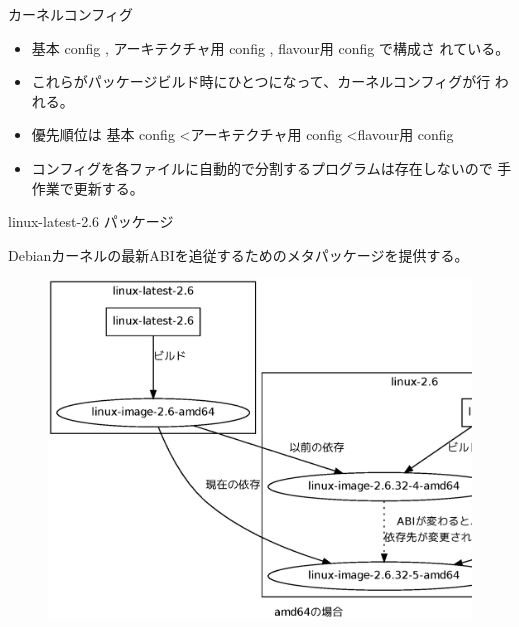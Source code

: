 \begin{frame}[containsverbatim]{カーネルコンフィグ}
\begin{itemize}
\item 基本 config , アーキテクチャ用 config , flavour用 config で構成さ
 れている。
\item これらがパッケージビルド時にひとつになって、カーネルコンフィグが行
 われる。
\item 優先順位は 基本 config \textless アーキテクチャ用 config \textless flavour用 config 
\item コンフィグを各ファイルに自動的で分割するプログラムは存在しないので
 手作業で更新する。
\end{itemize}
\end{frame}

\begin{frame}[containsverbatim]{linux-latest-2.6 パッケージ} 

Debianカーネルの最新ABIを追従するためのメタパッケージを提供する。
\begin{figure}[H]
\begin{center}
\includegraphics[width=1.0\hsize]{image201005/linux-latest-2.6.eps}
\end{center}
\end{figure}
\end{frame}

